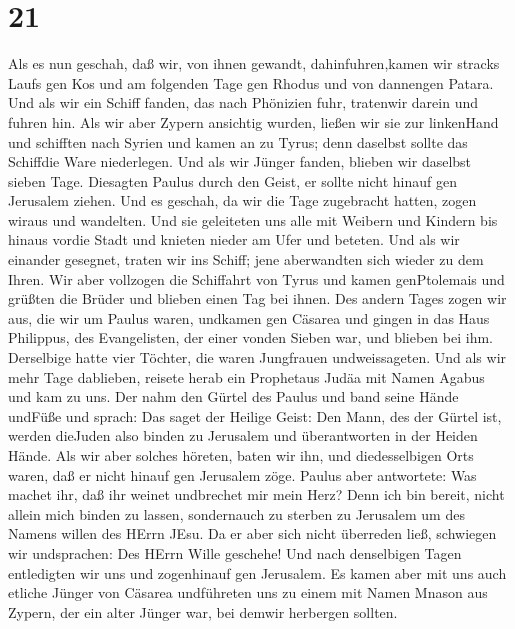 \hypertarget{section-20}{%
\section{21}\label{section-20}}

 Als es nun geschah, daß wir, von ihnen gewandt,
dahinfuhren,kamen wir stracks Laufs gen Kos und am folgenden Tage gen
Rhodus und von dannengen Patara.  Und als wir ein Schiff
fanden, das nach Phönizien fuhr, tratenwir darein und fuhren hin.
 Als wir aber Zypern ansichtig wurden, ließen wir sie zur
linkenHand und schifften nach Syrien und kamen an zu Tyrus; denn
daselbst sollte das Schiffdie Ware niederlegen.  Und als wir
Jünger fanden, blieben wir daselbst sieben Tage. Diesagten Paulus durch
den Geist, er sollte nicht hinauf gen Jerusalem ziehen.  Und
es geschah, da wir die Tage zugebracht hatten, zogen wiraus und
wandelten. Und sie geleiteten uns alle mit Weibern und Kindern bis
hinaus vordie Stadt und knieten nieder am Ufer und beteten. 
Und als wir einander gesegnet, traten wir ins Schiff; jene aberwandten
sich wieder zu dem Ihren.  Wir aber vollzogen die Schiffahrt
von Tyrus und kamen genPtolemais und grüßten die Brüder und blieben
einen Tag bei ihnen.  Des andern Tages zogen wir aus, die
wir um Paulus waren, undkamen gen Cäsarea und gingen in das Haus
Philippus, des Evangelisten, der einer vonden Sieben war, und blieben
bei ihm.  Derselbige hatte vier Töchter, die waren
Jungfrauen undweissageten.  Und als wir mehr Tage
dablieben, reisete herab ein Prophetaus Judäa mit Namen Agabus und kam
zu uns.  Der nahm den Gürtel des Paulus und band seine
Hände undFüße und sprach: Das saget der Heilige Geist: Den Mann, des der
Gürtel ist, werden dieJuden also binden zu Jerusalem und überantworten
in der Heiden Hände.  Als wir aber solches höreten, baten
wir ihn, und diedesselbigen Orts waren, daß er nicht hinauf gen
Jerusalem zöge.  Paulus aber antwortete: Was machet ihr,
daß ihr weinet undbrechet mir mein Herz? Denn ich bin bereit, nicht
allein mich binden zu lassen, sondernauch zu sterben zu Jerusalem um des
Namens willen des HErrn JEsu.  Da er aber sich nicht
überreden ließ, schwiegen wir undsprachen: Des HErrn Wille geschehe!
 Und nach denselbigen Tagen entledigten wir uns und
zogenhinauf gen Jerusalem.  Es kamen aber mit uns auch
etliche Jünger von Cäsarea undführeten uns zu einem mit Namen Mnason aus
Zypern, der ein alter Jünger war, bei demwir herbergen sollten.
